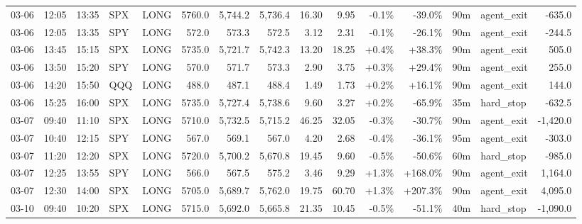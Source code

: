 \documentclass[11pt,a4paper,twoside]{article}
\begin{document}
\begin{landscape}
\begin{center}
\begin{longtable}{>{\color{txtmain}}l l l l l r r r r r r r r >{\color{txtmain}}l r}
03-06 & 12:05 & 13:35 & SPX & LONG & 5760.0 & 5,744.2 & 5,736.4 & 16.30 & 9.95 & \textcolor{lossred}{-0.1\%} & \textcolor{lossred}{-39.0\%} & 90m & agent\_exit & \textcolor{lossred}{-635.0} \\
03-06 & 12:05 & 13:35 & SPY & LONG & 572.0 & 573.3 & 572.5 & 3.12 & 2.31 & \textcolor{lossred}{-0.1\%} & \textcolor{lossred}{-26.1\%} & 90m & agent\_exit & \textcolor{lossred}{-244.5} \\
03-06 & 13:45 & 15:15 & SPX & LONG & 5735.0 & 5,721.7 & 5,742.3 & 13.20 & 18.25 & \textcolor{wingreen}{+0.4\%} & \textcolor{wingreen}{+38.3\%} & 90m & agent\_exit & \textcolor{wingreen}{505.0} \\
03-06 & 13:50 & 15:20 & SPY & LONG & 570.0 & 571.7 & 573.3 & 2.90 & 3.75 & \textcolor{wingreen}{+0.3\%} & \textcolor{wingreen}{+29.4\%} & 90m & agent\_exit & \textcolor{wingreen}{255.0} \\
03-06 & 14:20 & 15:50 & QQQ & LONG & 488.0 & 487.1 & 488.4 & 1.49 & 1.73 & \textcolor{wingreen}{+0.2\%} & \textcolor{wingreen}{+16.1\%} & 90m & agent\_exit & \textcolor{wingreen}{144.0} \\
03-06 & 15:25 & 16:00 & SPX & LONG & 5735.0 & 5,727.4 & 5,738.6 & 9.60 & 3.27 & \textcolor{wingreen}{+0.2\%} & \textcolor{lossred}{-65.9\%} & 35m & hard\_stop & \textcolor{lossred}{-632.5} \\
03-07 & 09:40 & 11:10 & SPX & LONG & 5710.0 & 5,732.5 & 5,715.2 & 46.25 & 32.05 & \textcolor{lossred}{-0.3\%} & \textcolor{lossred}{-30.7\%} & 90m & agent\_exit & \textcolor{lossred}{-1,420.0} \\
03-07 & 10:40 & 12:15 & SPY & LONG & 567.0 & 569.1 & 567.0 & 4.20 & 2.68 & \textcolor{lossred}{-0.4\%} & \textcolor{lossred}{-36.1\%} & 95m & agent\_exit & \textcolor{lossred}{-303.0} \\
03-07 & 11:20 & 12:20 & SPX & LONG & 5720.0 & 5,700.2 & 5,670.8 & 19.45 & 9.60 & \textcolor{lossred}{-0.5\%} & \textcolor{lossred}{-50.6\%} & 60m & hard\_stop & \textcolor{lossred}{-985.0} \\
03-07 & 12:25 & 13:55 & SPY & LONG & 566.0 & 567.5 & 575.2 & 3.46 & 9.29 & \textcolor{wingreen}{+1.3\%} & \textcolor{wingreen}{+168.0\%} & 90m & agent\_exit & \textcolor{wingreen}{1,164.0} \\
03-07 & 12:30 & 14:00 & SPX & LONG & 5705.0 & 5,689.7 & 5,762.0 & 19.75 & 60.70 & \textcolor{wingreen}{+1.3\%} & \textcolor{wingreen}{+207.3\%} & 90m & agent\_exit & \textcolor{wingreen}{4,095.0} \\
03-10 & 09:40 & 10:20 & SPX & LONG & 5715.0 & 5,692.0 & 5,665.8 & 21.35 & 10.45 & \textcolor{lossred}{-0.5\%} & \textcolor{lossred}{-51.1\%} & 40m & hard\_stop & \textcolor{lossred}{-1,090.0} \\

\end{longtable}
\end{center}
\end{landscape}
\end{document}
